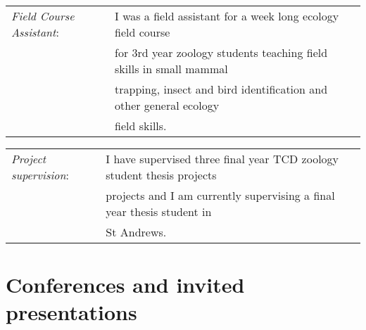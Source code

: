 \documentclass[10pt,a4paper]{article}
\begin{document}
\begin{flushleft}
\begin{tabular}{ll}
\textit{Field Course Assistant}:& I was a field assistant for a week long ecology field course\\ 
&for 3rd year zoology students teaching field skills in small mammal\\
&trapping, insect and bird identification and other general ecology\\
&field skills.
\end{tabular}

\begin{tabular}{ll}
\textit{Project supervision}:&\hspace{5.7mm} I have supervised three final year TCD zoology student thesis projects\\
&\hspace{5.7mm} projects and I am currently supervising a final year thesis student in\\
&\hspace{5.7mm} St Andrews.

\end{tabular}

\bigskip




\section{Conferences and invited presentations}


\end{flushleft}
\end{document}
